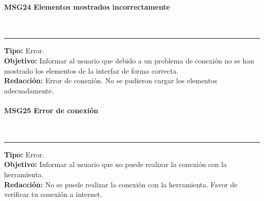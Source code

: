 \paragraph{\textcolor[rgb]{0, 0, 0.545098}{MSG24 Elementos mostrados incorrectamente}} \hspace{1cm} \\
\label{msj:MSG24}
\rule[3mm]{16.59cm}{0.1mm} \vspace{1mm}
\textbf{Tipo:} Error.\\
\textbf{Objetivo:} Informar al usuario que debido a un problema de conexión no se han mostrado los elementos de la interfaz de forma correcta.\\
\textbf{Redacción:} Error de conexión. No se pudieron cargar los elementos adecuadamente.\\

\paragraph{\textcolor[rgb]{0, 0, 0.545098}{MSG25 Error de conexión}} \hspace{1cm} \\
\label{msj:MSG25}
\rule[3mm]{16.59cm}{0.1mm} \vspace{1mm}
\textbf{Tipo:} Error.\\
\textbf{Objetivo:} Informar al usuario que no puede realizar la conexión con la herramienta.\\
\textbf{Redacción:} No se puede realizar la conexión con la herramienta. Favor de verificar tu conexión a internet.\\


\clearpage